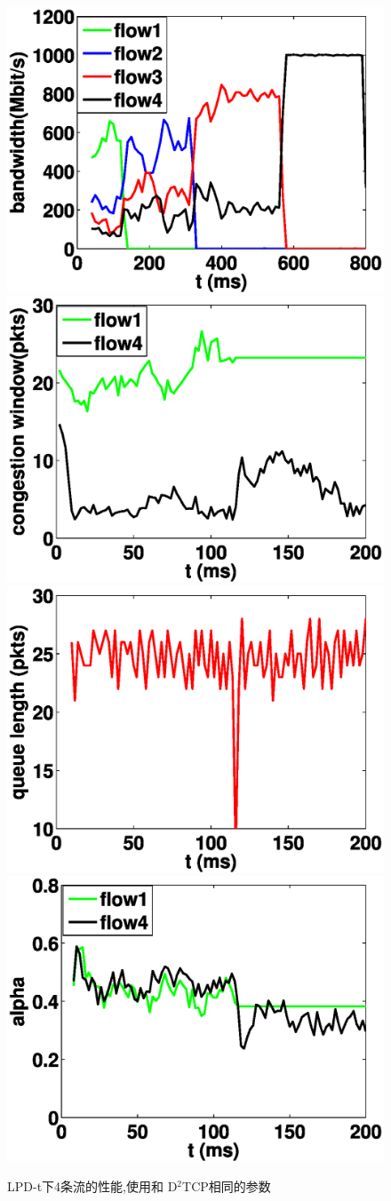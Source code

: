 \begin{figure}[h]
  \centering%
    {\includegraphics[width=0.5\columnwidth]{figures/LPD/evaluation_1/LPD_bandwidth.eps}}%
      {\includegraphics[width=0.5\columnwidth]{figures/LPD/evaluation_1/LPD_window.eps}}
    {\includegraphics[width=0.5\columnwidth]{figures/LPD/evaluation_1/LPD_queue.eps}}%
      {\includegraphics[width=0.5\columnwidth]{figures/LPD/evaluation_1/LPD_alpha.eps}}
  \caption{LPD-t下4条流的性能,使用和 D$^{2}$TCP相同的参数}
  \label{evalution_cases_fig}
\end{figure}



